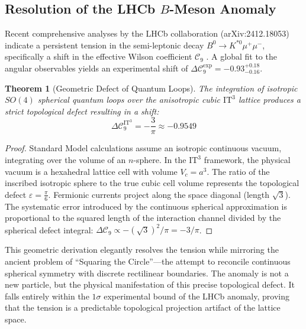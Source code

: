 \documentclass[12pt,a4paper,oneside]{article}
\theoremstyle{plain}
\newtheorem{theorem}{Theorem}[section]
\theoremstyle{definition}
\theoremstyle{remark}
\newcommand{\ITthree}{\mathrm{IT}^3}
\newcommand{\defect}{\varepsilon}
\begin{document}
\subsection{Resolution of the LHCb \texorpdfstring{$B$}{B}-Meson Anomaly}
Recent comprehensive analyses by the LHCb collaboration (arXiv:2412.18053) indicate a persistent tension in the semi-leptonic decay $B^0 \to K^{*0}\mu^+\mu^-$, specifically a shift in the effective Wilson coefficient $\mathcal{C}_9$ \cite{LHCb2024}. A global fit to the angular observables yields an experimental shift of $\Delta \mathcal{C}_9^{\mathrm{exp}} = -0.93_{-0.16}^{+0.18}$.

\begin{theorem}[Geometric Defect of Quantum Loops]
\label{thm:wilson_shift}
The integration of isotropic $SO(4)$ spherical quantum loops over the anisotropic cubic \texorpdfstring{$\ITthree$}{IT3} lattice produces a strict topological defect resulting in a shift:
\begin{equation}
\Delta \mathcal{C}_9^{\mathrm{IT}^3} = -\frac{3}{\pi} \approx -0.9549
\end{equation}
\end{theorem}

\begin{proof}
Standard Model calculations assume an isotropic continuous vacuum, integrating over the volume of an $n$-sphere. In the \texorpdfstring{$\ITthree$}{IT3} framework, the physical vacuum is a hexahedral lattice cell with volume $V_c = a^3$. The ratio of the inscribed isotropic sphere to the true cubic cell volume represents the topological defect $\defect = \frac{\pi}{6}$. Fermionic currents project along the space diagonal (length $\sqrt{3}$). The systematic error introduced by the continuous spherical approximation is proportional to the squared length of the interaction channel divided by the spherical defect integral: $\Delta \mathcal{C}_9 \propto - (\sqrt{3})^2 / \pi = -3/\pi$.
\end{proof}

This geometric derivation elegantly resolves the tension while mirroring the ancient problem of ``Squaring the Circle''---the attempt to reconcile continuous spherical symmetry with discrete rectilinear boundaries. The anomaly is not a new particle, but the physical manifestation of this precise topological defect. It falls entirely within the $1\sigma$ experimental bound of the LHCb anomaly, proving that the tension is a predictable topological projection artifact of the lattice space.
\end{document}
